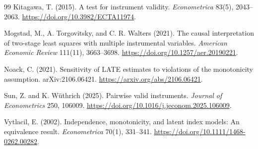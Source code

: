 \documentclass[11pt]{article}
\theoremstyle{definition}
\theoremstyle{plain}
\theoremstyle{remark}
\begin{document}
\begin{thebibliography}{99}
Kitagawa, T. (2015).
\newblock A test for instrument validity.
\newblock \emph{Econometrica} 83(5), 2043--2063.
\newblock \url{https://doi.org/10.3982/ECTA11974}.

Mogstad, M., A. Torgovitsky, and C. R. Walters (2021).
\newblock The causal interpretation of two-stage least squares with multiple
instrumental variables.
\newblock \emph{American Economic Review} 111(11), 3663--3698.
\newblock \url{https://doi.org/10.1257/aer.20190221}.

Noack, C. (2021).
\newblock Sensitivity of LATE estimates to violations of the monotonicity
assumption.
\newblock arXiv:2106.06421.
\newblock \url{https://arxiv.org/abs/2106.06421}.

Sun, Z. and K. W\"uthrich (2025).
\newblock Pairwise valid instruments.
\newblock \emph{Journal of Econometrics} 250, 106009.
\newblock \url{https://doi.org/10.1016/j.jeconom.2025.106009}.

Vytlacil, E. (2002).
\newblock Independence, monotonicity, and latent index models: An equivalence
result.
\newblock \emph{Econometrica} 70(1), 331--341.
\newblock \url{https://doi.org/10.1111/1468-0262.00282}.
\end{thebibliography}
\end{document}
